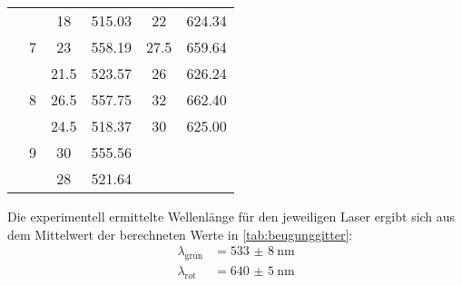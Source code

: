 \begin{table}[H]
\begin{tabular}{c S[table-format=1.0] S[table-format=2.1] S[table-format=3.2] S[table-format=2.1] S[table-format=3.2]}
                    &   &  18  & 515.03 &  22 & 624.34 \\
                    & 7 & 23   & 558.19 & 27.5& 659.64 \\
                    &   & 21.5 & 523.57 &  26 & 626.24 \\
                    & 8 & 26.5 & 557.75 &  32 & 662.40 \\
                    &   & 24.5 & 518.37 &  30 & 625.00 \\
                    & 9 & 30   & 555.56 &     & \\
                    &   &  28  & 521.64 &     & \\
      \bottomrule 
    \end{tabular}
  \end{table}

  \noindent Die experimentell ermittelte Wellenlänge für den jeweiligen Laser ergibt sich aus dem Mittelwert der berechneten Werte in \autoref{tab:beugunggitter}:
  \begin{align*}
    \lambda_{\text{grün}} &= \SI{533(8)}{\nano\metre}\\
    \lambda_{\text{rot}}  &= \SI{640(5)}{\nano\metre}
  \end{align*}